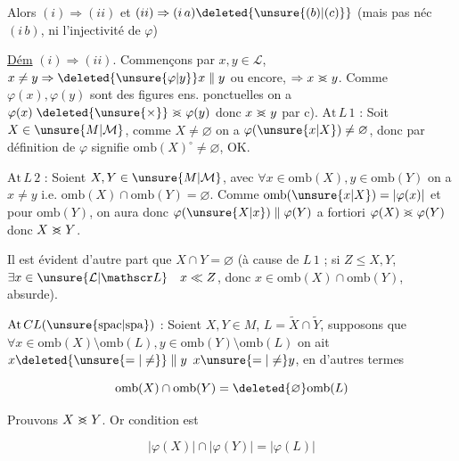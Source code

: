 Alors $(i)\Rightarrow(ii)$ et $(ii)\Rightarrow(i\,a)\deleted{\unsure{(b)|(c)}}$ (mais pas néc $(i\,b)$,  ni l'injectivité de $\varphi$)

\uline{Dém} $(i)\Rightarrow(ii)$.  Commençons par $x,y\in\mathcal L$, $x\ne y\Rightarrow\deleted{\unsure{\varphi|y}}x\parallel y$ ou encore, $\Rightarrow x\mathrel{>\mkern-13mu<}y$. Comme $\varphi(x),\varphi(y)$ sont des  figures ens. ponctuelles on a $\varphi(x)\mathrel{\deleted{\unsure{\times}}>\mkern-13mu<}\varphi(y)$ donc $x\mathrel{>\mkern-13mu<}y$ par c). $\mathrm{At}\,L\,1$ : Soit $X\in\unsure{M|\mathcal M}$,  comme $X\ne\varnothing$ on a $\varphi(\unsure{x|X})\ne\varnothing$, donc par définition de $\varphi$  signifie $\mathrm{omb}(X)^{\circ}\ne\varnothing$,  OK.


$\mathrm{At}\,L\,2$ : Soient $X,Y\in\unsure{M|\mathcal M}$, avec $\forall x\in\mathrm{omb}(X),y\in\mathrm{omb}(Y)$ on a $x\ne y$  i.e. $\mathrm{omb}(X)\cap\mathrm{omb}(Y)=\varnothing$.  Comme $\mathrm{omb}(\unsure{x|X})=\lvert\varphi(x)\rvert$ et  pour $\mathrm{omb}(Y)$, on aura donc $\varphi(\unsure{X|x})\parallel\varphi(Y)$ a fortiori \deleted{$\mathrel{>\mkern-13mu<}$} $\varphi(X)\mathrel{>\mkern-13mu<}\varphi(Y)$ donc $X\mathrel{>\mkern-13mu<}Y$.

Il est évident d'autre part que $X\cap Y=\varnothing$ (à cause de $L\,1$ ; si $Z\leq X,Y$, $\exists x\in\unsure{\mathcal L|\mathscr L}\quad x\ll Z$, donc $x\in\mathrm{omb}(X)\cap\mathrm{omb}(Y)$, absurde).

$\mathrm{At}\,CL(\unsure{\mathrm{spac}|\mathrm{spa}})$ : Soient $X,Y\in M$, $L=\widetilde X\cap\widetilde Y$, supposons que $\forall x\in\mathrm{omb}(X)\setminus\mathrm{omb}(L),y\in\mathrm{omb}(Y)\setminus\mathrm{omb}(L)$ on ait $x\deleted{\unsure{=|\ne}}\parallel y$  $x\unsure{=|\ne}y$, en d'autres termes

\[
\mathrm{omb}(X)\cap\mathrm{omb}(Y)=\deleted{\varnothing}\mathrm{omb}(L)
\]

Prouvons $X\mathrel{>\mkern-13mu<}Y$. Or   condition est

\[
\lvert\varphi(X)\rvert\cap\lvert\varphi(Y)\rvert=\lvert\varphi(L)\rvert
\]

